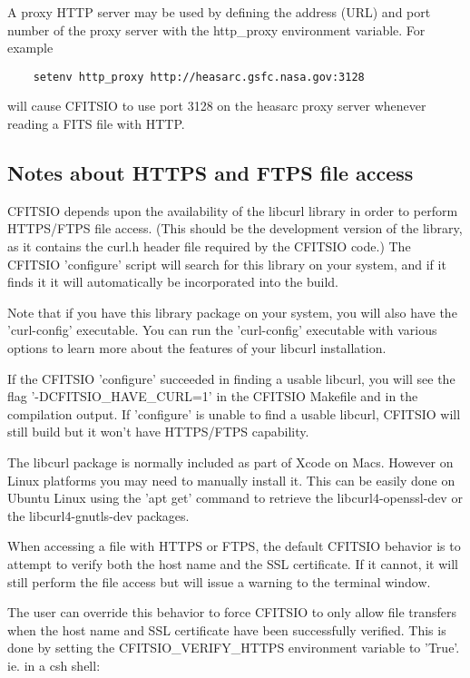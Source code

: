 \documentclass[11pt]{book}
\begin{document}
A proxy HTTP server may be used by defining the address (URL) and port
number of the proxy server with the http\_proxy environment variable.
For example

\begin{verbatim}
    setenv http_proxy http://heasarc.gsfc.nasa.gov:3128
\end{verbatim}
will cause CFITSIO to use port 3128 on the heasarc proxy server whenever
reading a FITS file with HTTP.

\subsection{Notes about HTTPS and FTPS file access}

CFITSIO depends upon the availability of the libcurl library in order to perform 
HTTPS/FTPS file access.  (This should be the development version of the library, as
it contains the curl.h header file required by the CFITSIO code.)   The CFITSIO
'configure' script will search for this library on your system, and if it finds it 
it will automatically be incorporated into the build.  

Note that if you have this library package on your system, you will also have the 'curl-config'
executable.  You can run the 'curl-config' executable with various options to learn
more about the features of your libcurl installation.

If the CFITSIO 'configure' succeeded in finding a usable libcurl, you will see the flag
'-DCFITSIO\_HAVE\_CURL=1' in the CFITSIO Makefile and in the compilation output.  
If 'configure' is unable to find a usable libcurl, CFITSIO will still build 
but it won't have HTTPS/FTPS capability.

The libcurl package is normally included as part of Xcode on Macs.  However on Linux platforms you 
may need to manually install it. This can be easily done on Ubuntu Linux using
the 'apt get' command to retrieve the libcurl4-openssl-dev or the libcurl4-gnutls-dev packages.

When accessing a file with HTTPS or FTPS, the default CFITSIO behavior is to attempt
to verify both the host name and the SSL certificate.  If it cannot, it will still 
perform the file access but will issue a warning to the terminal window.

The user can override this behavior to force CFITSIO to only allow file transfers
when the host name and SSL certificate have been successfully verified.  This is
done by setting the CFITSIO\_VERIFY\_HTTPS environment variable to 'True'. ie. in a
csh shell:
\end{document}
